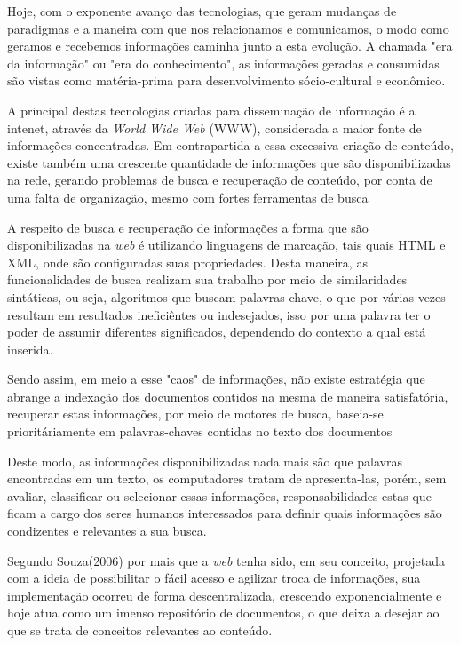 Hoje, com o exponente avanço das tecnologias, que geram mudanças de paradigmas e a maneira com que nos relacionamos e comunicamos, o modo como geramos e recebemos informações caminha junto a esta evolução. A chamada "era da informação" ou "era do conhecimento", as informações geradas e consumidas são vistas como matéria-prima para
 desenvolvimento sócio-cultural e econômico\cite{takahashi:2000}.

A principal destas tecnologias criadas para disseminação de informação é a intenet, através da \textit{World Wide Web} (WWW), considerada a maior fonte de informações concentradas\cite{alves:2004}. Em contrapartida a essa excessiva criação de conteúdo, existe também uma crescente quantidade de informações que são disponibilizadas na rede, gerando problemas de busca e recuperação de conteúdo, por conta de uma falta de organização, mesmo com fortes ferramentas de busca\cite{breitman:2006}

A respeito de busca e recuperação de informações a forma que são disponibilizadas na \textit{web} é utilizando linguagens de marcação, tais quais HTML e XML, onde são configuradas suas propriedades\cite{breitman:2006}. Desta maneira, as funcionalidades de busca realizam sua trabalho por meio de similaridades sintáticas, ou seja, algoritmos que buscam palavras-chave, o que por várias vezes resultam em resultados ineficiêntes ou indesejados, isso por uma palavra ter o poder de assumir diferentes significados, dependendo do contexto a qual está inserida\cite{breitman:2006}.

Sendo assim, em meio a esse "caos" de informações, não existe estratégia que abrange a indexação dos documentos contidos na mesma de maneira satisfatória, recuperar estas informações, por meio de motores de busca, baseia-se prioritáriamente em palavras-chaves contidas no texto dos documentos\cite{souza:2004}

Deste modo, as informações disponibilizadas nada mais são que palavras encontradas em um texto, os computadores tratam de apresenta-las, porém, sem avaliar, classificar ou selecionar essas informações, responsabilidades estas que ficam a cargo dos seres humanos interessados para definir quais informações são condizentes e relevantes a sua busca\cite{breitman:2006}.

Segundo Souza(2006) por mais que a \textit{web} tenha sido, em seu conceito, projetada com a ideia de possibilitar o fácil acesso e agilizar troca de informações, sua implementação ocorreu de forma descentralizada, crescendo exponencialmente e hoje atua como um imenso repositório de documentos, o que deixa a desejar ao que se trata de conceitos relevantes ao conteúdo.

